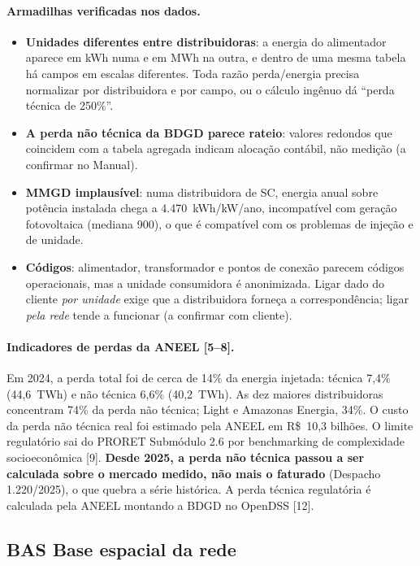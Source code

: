 \paragraph{Armadilhas verificadas nos dados.}
\begin{itemize}
  \item \textbf{Unidades diferentes entre distribuidoras}: a energia do
    alimentador aparece em kWh numa e em MWh na outra, e dentro de uma mesma
    tabela há campos em escalas diferentes. Toda razão perda/energia precisa
    normalizar por distribuidora e por campo, ou o cálculo ingênuo dá
    ``perda técnica de 250\%''.
  \item \textbf{A perda não técnica da BDGD parece rateio}: valores redondos
    que coincidem com a tabela agregada indicam alocação contábil, não
    medição (a confirmar no Manual).
  \item \textbf{MMGD implausível}: numa distribuidora de SC, energia anual
    sobre potência instalada chega a 4.470~kWh/kW/ano, incompatível com
    geração fotovoltaica (mediana 900), o que é compatível com os problemas de
    injeção e de unidade.
  \item \textbf{Códigos}: alimentador, transformador e pontos de conexão
    parecem códigos operacionais, mas a unidade consumidora é anonimizada.
    Ligar dado do cliente \emph{por unidade} exige que a distribuidora
    forneça a correspondência; ligar \emph{pela rede} tende a funcionar (a
    confirmar com cliente).
\end{itemize}

\paragraph{Indicadores de perdas da ANEEL [5--8].} Em 2024, a perda total foi
de cerca de 14\% da energia injetada: técnica 7,4\% (44,6~TWh) e não técnica
6,6\% (40,2~TWh). As dez maiores distribuidoras concentram 74\% da perda não
técnica; Light e Amazonas Energia, 34\%. O custo da perda não técnica real foi
estimado pela ANEEL em R\$~10,3 bilhões. O limite regulatório sai do PRORET Submódulo
2.6 por benchmarking de complexidade socioeconômica [9]. \textbf{Desde 2025, a
perda não técnica passou a ser calculada sobre o mercado medido, não mais o
faturado} (Despacho 1.220/2025), o que quebra a série histórica. A perda
técnica regulatória é calculada pela ANEEL montando a BDGD no OpenDSS [12].

\subsection{BAS \textperiodcentered{} Base espacial da rede}

